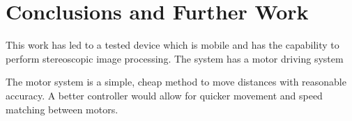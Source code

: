\chapter{Conclusions and Further Work} \label{Chapter: Conclusions}

This work has led to a tested device which is mobile and has the capability to perform stereoscopic image processing. The system has a motor driving system

The motor system is a simple, cheap method to move distances with reasonable accuracy. A better controller would allow for quicker movement and speed matching between motors. 
